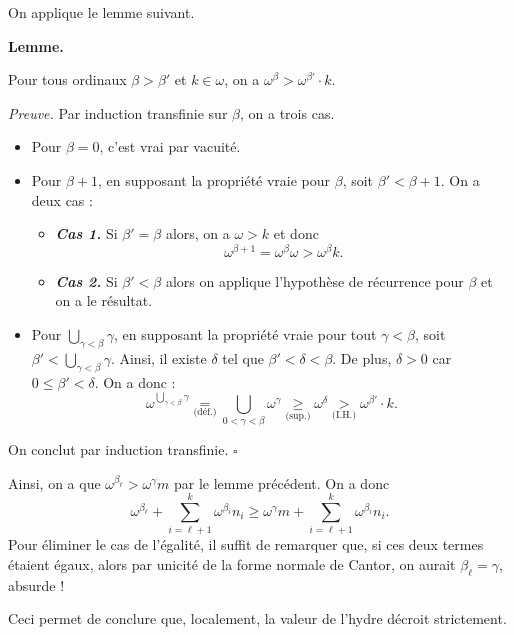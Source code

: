 \documentclass{../notes}
\begin{document}
\begin{enumerate}
      On applique le lemme suivant.

      \textbf{Lemme.}
      \begin{slshape}
        Pour tous ordinaux $\beta > \beta'$ et $k \in \omega$, on a $\omega^{\beta} > \omega^{\beta'} \cdot k$.
      \end{slshape}

      \textit{Preuve.} Par induction transfinie sur $\beta$, on a trois cas.
      \begin{itemize}
        \item Pour $\beta = 0$, c'est vrai par vacuité.
        \item Pour $\beta + 1$, en supposant la propriété vraie pour $\beta$, soit $\beta' < \beta + 1$.
          On a deux cas :
           \begin{itemize}
            \item \textit{\textbf{Cas 1.}} Si $\beta' = \beta$ alors, on a $\omega > k$ et donc \[
              \omega^{\beta+1} = \omega^{\beta}\omega > \omega^{\beta}k
              .\] 
            \item \textit{\textbf{Cas 2.}} Si $\beta' < \beta$ alors on applique l'hypothèse de récurrence pour $\beta$ et on a le résultat.
          \end{itemize}
        \item Pour $\bigcup_{\gamma < \beta} \gamma$, en supposant la propriété vraie pour tout $\gamma < \beta$, soit $\beta' < \bigcup_{\gamma < \beta} \gamma$.
          Ainsi, il existe $\delta$ tel que $\beta' < \delta < \beta$.
          De plus, $\delta > 0$ car $0 \le \beta' < \delta$.
          On a donc :
          \[
            \omega^{\bigcup_{\gamma < \beta} \gamma} \underset{\text{(déf.)}}= \bigcup_{0 < \gamma < \beta} \omega^{\gamma} \underset{\text{(sup.)}}\ge \omega^{\delta} \underset{\text{(I.H.)}}> \omega^{\beta'} \cdot k
          .\]
      \end{itemize}
      On conclut par induction transfinie. \hfill $\square$

      Ainsi, on a que $\omega^{\beta_\ell} > \omega^{\gamma} m$ par le lemme précédent.
      On a donc \[
      \omega^{\beta_\ell} + \sum_{i=\ell+1}^k \omega^{\beta_i} n_i \ge \omega^{\gamma} m + \sum_{i=\ell+1}^k \omega^{\beta_i} n_i
      .\]
      Pour éliminer le cas de l'égalité, il suffit de remarquer que, si ces deux termes étaient égaux, alors par unicité de la forme normale de Cantor, on aurait $\beta_\ell = \gamma$, absurde !

      Ceci permet de conclure que, localement, la valeur de l'hydre décroit strictement.


\end{enumerate}
\end{document}
